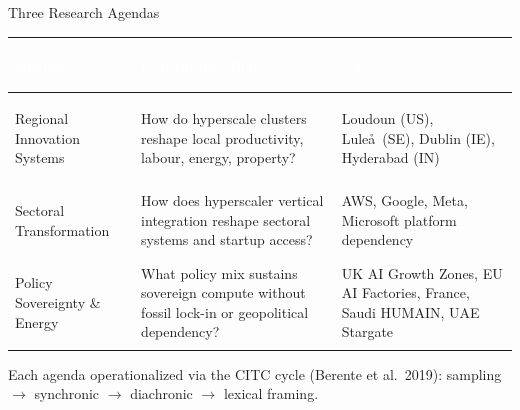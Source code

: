 \documentclass[aspectratio=169,11pt]{beamer}
\newcommand{\iconfull}[2]{\textcolor{#1}{\faIcon{#2}}}
\begin{document}
\begin{frame}[shrink=3]{\iconfull{dcblue}{map}\enspace Three Research Agendas}
\vspace{-0.1em}
{\footnotesize\setlength{\tabcolsep}{4pt}
\begin{tabularx}{\linewidth}{@{}>{\bfseries\raggedright}p{2.6cm}XX@{}}
\toprule
\rowcolor{black!88}
\textcolor{white}{\textbf{Agenda}} &
\textcolor{white}{\textbf{Central question}} &
\textcolor{white}{\textbf{Cases}} \\
\midrule
Regional Innovation Systems &
How do hyperscale clusters reshape local productivity, labour, energy, property? &
Loudoun (US), Lule\aa\ (SE), Dublin (IE), Hyderabad (IN) \\
\rowcolor{black!8}
Sectoral Transformation &
How does hyperscaler vertical integration reshape sectoral systems and startup access? &
AWS, Google, Meta, Microsoft platform dependency \\
Policy Sovereignty \& Energy &
What policy mix sustains sovereign compute without fossil lock-in or geopolitical dependency? &
UK AI Growth Zones, EU AI Factories, France, Saudi HUMAIN, UAE Stargate \\
\bottomrule
\end{tabularx}}
\vspace{0.2em}
\footnotesize\textcolor{dcgray}{Each agenda operationalized via the CITC cycle (Berente et al.\ 2019): sampling $\to$ synchronic $\to$ diachronic $\to$ lexical framing.}
\end{frame}
\end{document}
